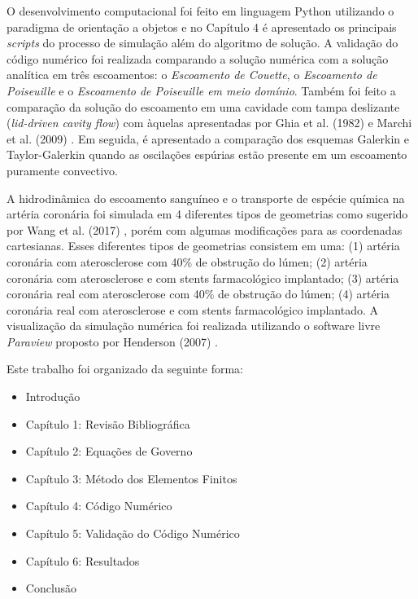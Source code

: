 \medskip
O desenvolvimento computacional foi feito em linguagem Python utilizando
o paradigma de orientação a objetos e no Capítulo 4 é apresentado
os principais \textit{scripts} do processo de simulação além
do algoritmo de solução. A validação do código numérico foi
realizada comparando a solução numérica com a solução analítica em três escoamentos:
o \textit{Escoamento de Couette}, o \textit{Escoamento de Poiseuille} e
o \textit{Escoamento de Poiseuille em meio domínio}. 
Também foi feito a comparação da solução do escoamento em uma cavidade
com tampa deslizante (\textit{lid-driven cavity flow}) com àquelas
apresentadas por Ghia et al. (1982) \cite{ghia1982} e Marchi et al. (2009) \cite{marchi2009}.
Em seguida, é apresentado a comparação dos esquemas Galerkin e 
Taylor-Galerkin quando as oscilações espúrias estão presente em um escoamento
puramente convectivo.

\medskip
A hidrodinâmica do escoamento sanguíneo e o transporte
de espécie química na artéria coronária foi simulada em 4 diferentes tipos de geometrias
como sugerido por Wang et al. (2017) \cite{wang2017}, porém com algumas modificações
para as coordenadas cartesianas. Esses diferentes tipos de geometrias
consistem em uma: 
(1) artéria coronária com aterosclerose com 40\% de obstrução do lúmen; 
(2) artéria coronária com aterosclerose e com stents farmacológico implantado; 
(3) artéria coronária real com aterosclerose com 40\% de obstrução do lúmen; 
(4) artéria coronária real com aterosclerose e com stents farmacológico implantado. 
A visualização da simulação numérica foi realizada
utilizando o software livre \textit{Paraview} proposto por Henderson (2007) \cite{paraview}.

\medskip
\noindent
Este trabalho foi organizado da seguinte forma:

\begin{itemize}
 \item Introdução\\[-1cm] 
 \item Capítulo 1: Revisão Bibliográfica\\[-1cm]
 \item Capítulo 2: Equações de Governo\\[-1cm]
 \item Capítulo 3: Método dos Elementos Finitos\\[-1cm]
 \item Capítulo 4: Código Numérico\\[-1cm]
 \item Capítulo 5: Validação do Código Numérico\\[-1cm]
 \item Capítulo 6: Resultados\\[-1cm]
 \item Conclusão
\end{itemize}
